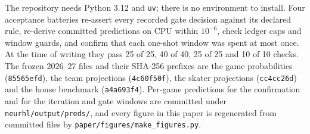 The repository needs Python 3.12 and \texttt{uv}; there is no environment to
install. Four acceptance batteries re-assert every recorded gate decision
against its declared rule, re-derive committed predictions on CPU within
$10^{-6}$, check ledger caps and window guards, and confirm that each one-shot
window was spent at most once. At the time of writing they pass 25 of 25, 40 of
40, 25 of 25 and 10 of 10 checks. The frozen 2026--27 files and their SHA-256
prefixes are the game probabilities (\texttt{85565efd}), the team projections
(\texttt{4c60f50f}), the skater projections (\texttt{cc4cc26d}) and the house
benchmark (\texttt{a4a693f4}). Per-game predictions for the \neurhlH{} confirmation
and for the \neurhlG{} iteration and gate windows are committed under
\texttt{neurhl/output/preds/}, and every figure in this paper is regenerated
from committed files by \texttt{paper/figures/make\_figures.py}.
